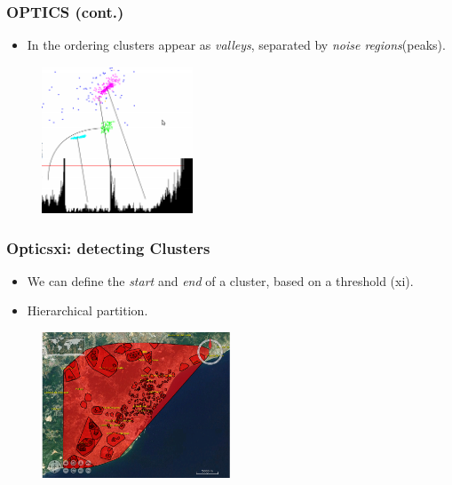 \documentclass[hyperref={pdfpagelabels=true}]{beamer}
\begin{document}
\begin{frame}
\frametitle{OPTICS (cont.)}
\begin{itemize}
      \item<2->In the ordering clusters appear as \textit{valleys}, separated by \textit{noise regions}(peaks). 
\end{itemize}                
  \begin{figure}   
    \includegraphics[width=0.4\textwidth]{dendrogram.png}   
  \end{figure}     
\end{frame}


\begin{frame}
\frametitle{Opticsxi: detecting Clusters}
\begin{itemize}
      \item<2->We can define the \textit{start} and \textit{end} of a cluster, based on a threshold (xi).%
      \item<3->Hierarchical partition.%
\end{itemize}                
  \begin{figure}   
    \includegraphics[width=0.5\textwidth]{2000_025_100_w_removal.png}   
  \end{figure}     
\end{frame}
\end{document}
